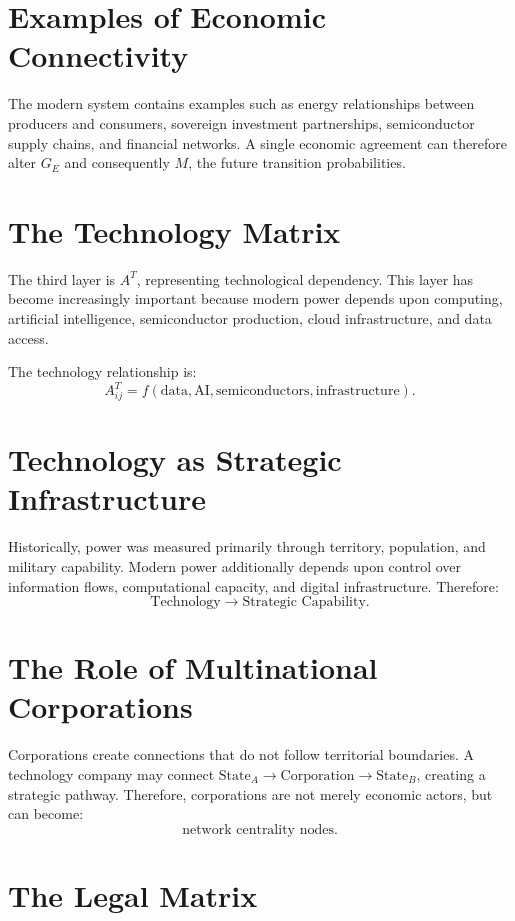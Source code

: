 \documentclass[11pt,openany]{book}
\theoremstyle{plain}
\theoremstyle{definition}
\begin{document}
\section*{Examples of Economic Connectivity}

The modern system contains examples such as energy relationships between producers and consumers, sovereign investment partnerships, semiconductor supply chains, and financial networks. A single economic agreement can therefore alter \(G_E\) and consequently \(M\), the future transition probabilities.

\section*{The Technology Matrix}

The third layer is \(A^T\), representing technological dependency. This layer has become increasingly important because modern power depends upon computing, artificial intelligence, semiconductor production, cloud infrastructure, and data access.

The technology relationship is:
\[
A^T_{ij} = f(\text{data}, \text{AI}, \text{semiconductors}, \text{infrastructure}).
\]

\section*{Technology as Strategic Infrastructure}

Historically, power was measured primarily through territory, population, and military capability. Modern power additionally depends upon control over information flows, computational capacity, and digital infrastructure. Therefore:
\[
\text{Technology}
\longrightarrow
\text{Strategic Capability}.
\]

\section*{The Role of Multinational Corporations}

Corporations create connections that do not follow territorial boundaries. A technology company may connect \(\text{State}_A \to \text{Corporation} \to \text{State}_B\), creating a strategic pathway. Therefore, corporations are not merely economic actors, but can become:
\[
\boxed{
\text{network centrality nodes}.
}
\]

\section*{The Legal Matrix}
\end{document}
